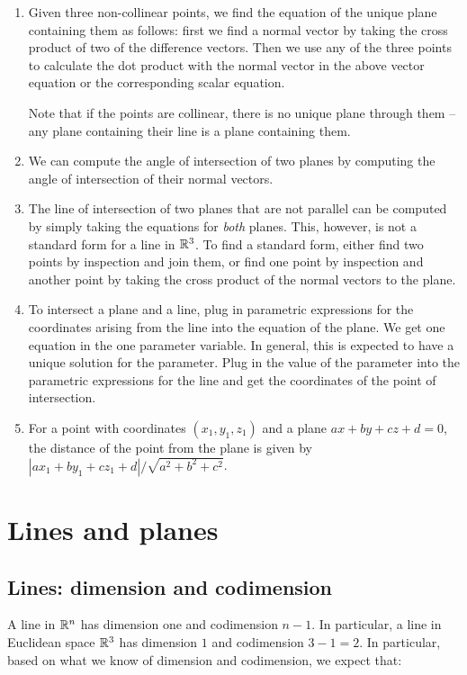 \documentclass[10pt]{amsart}
\begin{document}
\begin{enumerate}
\item Given three non-collinear points, we find the equation of the
  unique plane containing them as follows: first we find a normal
  vector by taking the cross product of two of the difference
  vectors. Then we use any of the three points to calculate the dot
  product with the normal vector in the above vector equation or the
  corresponding scalar equation.

  Note that if the points are collinear, there is no unique plane
  through them -- any plane containing their line is a plane
  containing them.
\item We can compute the angle of intersection of two planes by
  computing the angle of intersection of their normal vectors.
\item The line of intersection of two planes that are not parallel can
  be computed by simply taking the equations for {\em both}
  planes. This, however, is not a standard form for a line in
  $\mathbb{R}^3$. To find a standard form, either find two points by
  inspection and join them, or find one point by inspection and
  another point by taking the cross product of the normal vectors to
  the plane.
\item To intersect a plane and a line, plug in parametric expressions
  for the coordinates arising from the line into the equation of the
  plane. We get one equation in the one parameter variable. In
  general, this is expected to have a unique solution for the
  parameter. Plug in the value of the parameter into the parametric
  expressions for the line and get the coordinates of the point of
  intersection.
\item For a point with coordinates $(x_1,y_1,z_1)$ and a plane $ax +
  by + cz + d = 0$, the distance of the point from the plane is given
  by $|ax_1 + by_1 + cz_1 + d|/\sqrt{a^2 + b^2 + c^2}$.
\end{enumerate}
\section{Lines and planes}

\subsection{Lines: dimension and codimension}

A line in $\mathbb{R}^n$ has dimension one and codimension $n - 1$. In
particular, a line in Euclidean space $\mathbb{R}^3$ has dimension $1$ and
codimension $3 - 1 =2$. In particular, based on what we know of
dimension and codimension, we expect that:
\end{document}
